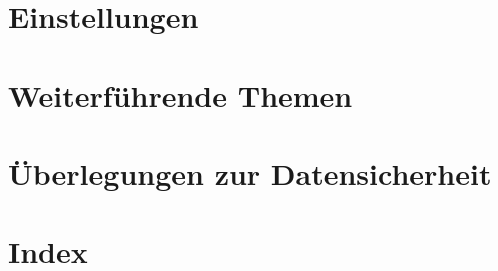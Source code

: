 \documentclass[paper=a4,BCOR8.25mm,twoside]{scrbook}
\begin{document}
\chapter{Einstellungen}
	

\chapter{Weiterführende Themen}
    

\chapter{Überlegungen zur Datensicherheit}	
	

\chapter{Index}
\printindex
\end{document}
